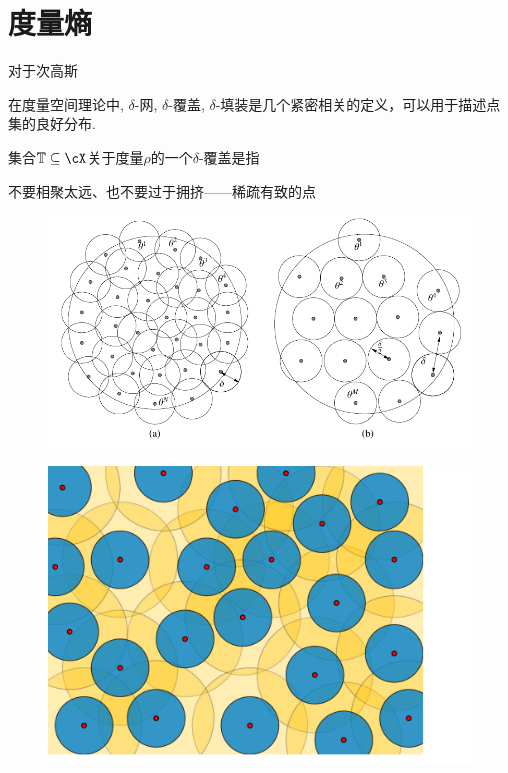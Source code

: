 \section{度量熵}

对于次高斯


在度量空间理论中, $\delta$-网,  $\delta$-覆盖, $\delta$-填装是几个紧密相关的定义，可以用于描述点集的良好分布. 

集合$\bT \subseteq \cX$关于度量$\rho$的一个$\delta$-覆盖是指


不要相聚太远、也不要过于拥挤——稀疏有致的点

\begin{figure}[H]
	\centering 
	\includegraphics[width=.95\textwidth]{figure/covering-packing.pdf}
\end{figure}


\begin{figure}[H]
	\centering 
	\includegraphics[width=.5\textwidth]{figure/Metric_epsilon-net.pdf}
\end{figure}







